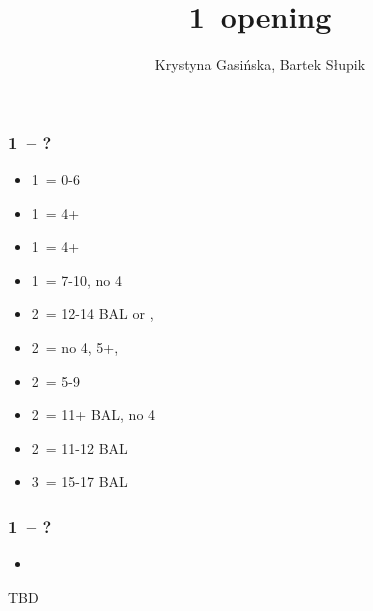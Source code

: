 \documentclass[12pt, a4paper]{article}
\title{1\mins\ opening}
\author{Krystyna Gasińska, Bartek Słupik}
\begin{document}
\maketitle


\subsubsection*{1\clubs\ -- ?}
\begin{itemize}
    \item 1\diams\ = 0-6
    \item 1\hearts\ = 4+\hearts
    \item 1\spades\ = 4+\spades
    \item 1\ntx\ = 7-10, no 4\majs
    \item 2\clubs\ = 12-14 BAL or \clubs, \gf
    \item 2\diams\ = no 4\majs, 5+\diams, \gf
    \item 2\hearts\ = 5-9
    \item 2\spades\ = 11+ BAL, no 4\majs
    \item 2\ntx\ = 11-12 BAL
    \item 3\nt\ = 15-17 BAL
\end{itemize}

\subsubsection*{1\clubs\ -- ?}
\begin{itemize}
    \item 
\end{itemize}

TBD

\end{document}
